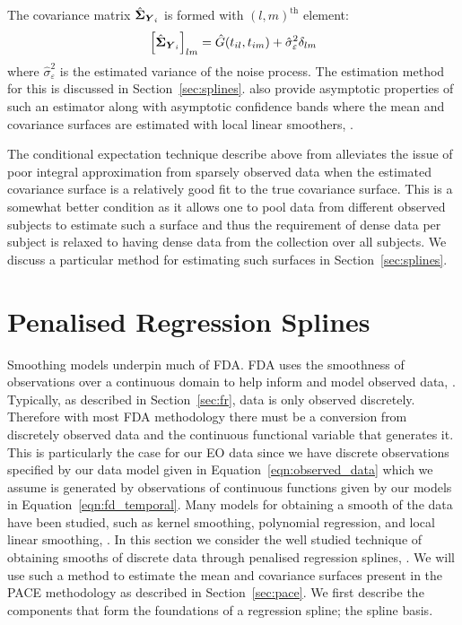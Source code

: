 The covariance matrix $\hat{\bm{{\Sigma}}}_{\bm{{Y}}_{i}}$ is formed with $\left(l, m\right)^\text{th}$ element:
\begin{equation}\label{eqn:sig_cov}
	\left[\hat{\bm{{\Sigma}}}_{\bm{{Y}}_{i}}\right]_{lm} = \hat{G}(t_{il}, t_{im}) + \hat{\sigma}_\varepsilon^2 \delta_{lm}
\end{equation}
where $\hat{\sigma}_\varepsilon^2$ is the estimated variance of the noise process.
The estimation method for this is discussed in Section~\ref{sec:splines}.
\citeauthor{yao_functional_2005} also provide asymptotic properties of such an estimator  along with asymptotic confidence bands where the mean and covariance surfaces are estimated with local linear smoothers, \citep{fan_study_1996}.

The conditional expectation technique describe above from \citep{yao_functional_2005} alleviates the issue of poor integral approximation from sparsely observed data when the estimated covariance surface is a relatively good fit to the true covariance surface.
This is a somewhat better condition as it allows one to pool data from different observed subjects to estimate such a surface and thus the requirement of dense data per subject is relaxed to having dense data from the collection over all subjects.
We discuss a particular method for estimating such surfaces in Section~\ref{sec:splines}.

\section{Penalised Regression Splines \label{sec:splines}}
 Smoothing models underpin much of FDA.
 FDA uses the smoothness of observations over a continuous domain to help inform and model observed data, \citep{ramsay_functional_2010}.
 Typically, as described in Section~\ref{sec:fr}, data is only observed discretely.
 Therefore with most FDA methodology there must be a conversion from discretely observed data and the continuous functional variable that generates it.
 This is particularly the case for our EO data since we have discrete observations specified by our data model given in Equation~\eqref{eqn:observed_data} which we assume is generated by observations of continuous functions given by our models in Equation~\eqref{eqn:fd_temporal}.
 Many models for obtaining a smooth of the data have been studied, such as kernel smoothing, polynomial regression, and local linear smoothing, \citep[Chapter~4]{ramsay_functional_2010}. 
 In this section we consider the well studied technique of obtaining smooths of discrete data through penalised regression splines, \citep{ruppert_semiparametric_2003}.
 We will use such a method to estimate the mean and covariance surfaces present in the PACE methodology as described in Section~\ref{sec:pace}. 
 We first describe the components that form the foundations of a regression spline; the spline basis.
 
